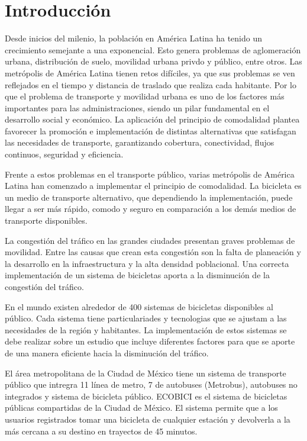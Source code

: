 \section{Introducción}

Desde inicios del milenio, la población en América Latina ha tenido un crecimiento semejante a una exponencial\cite{CEPAL_2015}. Esto genera problemas de aglomeración urbana, distribución de suelo, movilidad urbana privdo y público, entre otros. Las metrópolis de América Latina tienen retos difíciles, ya que sus problemas se ven reflejados en el tiempo y distancia de traslado que realiza cada habitante\cite{hall_1978}. Por lo que el problema de transporte y movilidad urbana es uno de los factores más importantes para las administraciones, siendo un pilar fundamental en el desarrollo social y económico. La aplicación del principio de comodalidad plantea favorecer la promoción e implementación de distintas alternativas que satisfagan las necesidades de transporte, garantizando cobertura, conectividad, flujos continuos, seguridad y eficiencia\cite{pastori_2018}.

Frente a estos problemas en el transporte público, varias metrópolis de América Latina han comenzado a implementar el principio de comodalidad. La bicicleta es un medio de transporte alternativo, que dependiendo la implementación, puede llegar a ser más rápido, comodo y seguro en comparación a los demás medios de transporte disponibles.

La congestión del tráfico en las grandes ciudades presentan graves problemas de movilidad. Entre las causas que crean esta congestión son la falta de planeación y la desarrollo en la infraestructura y la alta densidad poblacional. Una correcta implementación de un sistema de bicicletas aporta a la disminución de la congestión del tráfico.

En el mundo existen alrededor de 400 sistemas de bicicletas disponibles al público. Cada sistema tiene particulariades y tecnologias que se ajustam a las necesidades de la región y habitantes. La implementación de estos sistemas se debe realizar sobre un estudio que incluye diferentes factores para que se aporte de una manera eficiente hacia la disminución del tráfico.

El área metropolitana de la Ciudad de México tiene un sistema de transporte público que intregra 11 línea de metro, 7 de autobuses (Metrobus), autobuses no integrados y sistema de bicicleta público. ECOBICI es el sistema de bicicletas públicas compartidas de la Ciudad de México. El sistema permite que a los usuarios registrados tomar una bicicleta de cualquier estación y devolverla a la más cercana a su destino en trayectos de 45 minutos.

